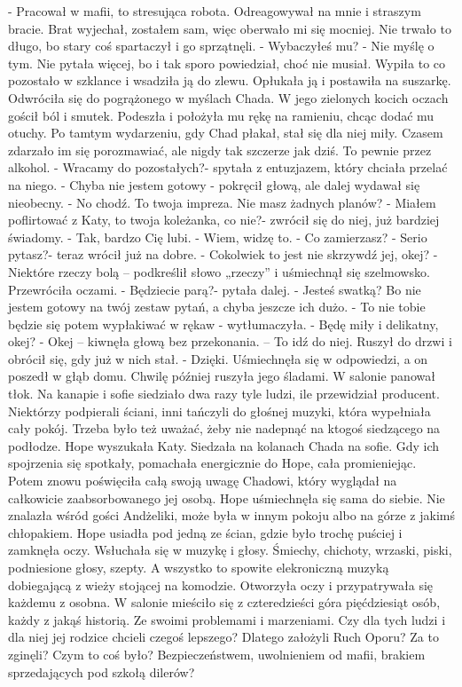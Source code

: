 \documentclass[12pt,a4paper]{book}
\begin{document}
- Pracował w mafii, to stresująca robota. Odreagowywał na mnie i straszym bracie. Brat wyjechał, zostałem sam, więc oberwało mi się mocniej. Nie trwało to długo, bo stary coś spartaczył i go sprzątnęli. 
- Wybaczyłeś mu?
- Nie myślę o tym. 
Nie pytała więcej, bo i tak sporo powiedział, choć nie musiał. Wypiła to co pozostało w szklance i wsadziła ją do zlewu. Opłukała ją i postawiła na suszarkę. 
Odwróciła się do pogrążonego w myślach Chada. W jego zielonych kocich oczach gościł ból i smutek. Podeszła i położyła mu rękę na ramieniu, chcąc dodać mu otuchy. Po tamtym wydarzeniu, gdy Chad płakał, stał się dla niej miły. Czasem zdarzało im się porozmawiać, ale nigdy tak szczerze jak dziś. To pewnie przez alkohol. 
- Wracamy do pozostałych?- spytała z entuzjazem, który chciała przelać na niego. 
- Chyba nie jestem gotowy - pokręcił głową, ale dalej wydawał się nieobecny. 
- No chodź. To twoja impreza. Nie masz żadnych planów? 
- Miałem poflirtować z Katy, to twoja koleżanka, co nie?- zwrócił się do niej, już bardziej świadomy. 
- Tak, bardzo Cię lubi.
- Wiem, widzę to. 
- Co zamierzasz?
- Serio pytasz?- teraz wrócił już na dobre.
- Cokolwiek to jest nie skrzywdź jej, okej?
- Niektóre rzeczy bolą – podkreślił słowo „rzeczy” i uśmiechnął się szelmowsko. 
Przewróciła oczami. 
- Będziecie parą?- pytała dalej.
- Jesteś swatką? Bo nie jestem gotowy na twój zestaw pytań, a chyba jeszcze ich dużo. 
- To nie tobie będzie się potem wypłakiwać w rękaw -  wytłumaczyła. 
- Będę miły i delikatny, okej?
- Okej – kiwnęła głową bez przekonania. – To idź do niej.
Ruszył do drzwi i obrócił się, gdy już w nich stał.
- Dzięki.
Uśmiechnęła się w odpowiedzi, a on poszedł w głąb domu. Chwilę później ruszyła jego śladami. W salonie panował tłok. Na kanapie i sofie siedziało dwa razy tyle ludzi, ile przewidział producent. Niektórzy podpierali ściani, inni tańczyli do głośnej muzyki, która wypełniała cały pokój. Trzeba było też uważać, żeby nie nadepnąć na ktogoś siedzącego na podłodze. Hope wyszukała Katy. Siedzała na kolanach Chada na sofie. Gdy ich spojrzenia się spotkały, pomachała energicznie do Hope, cała promieniejąc. Potem znowu poświęciła całą swoją uwagę Chadowi, który wyglądał na całkowicie zaabsorbowanego jej osobą. Hope uśmiechnęła się sama do siebie. 
Nie znalazła wśród gości Andżeliki, może była w innym pokoju albo na górze z jakimś chłopakiem. 
Hope usiadła pod jedną ze ścian, gdzie było trochę puściej i zamknęła oczy. Wsłuchała się w muzykę i głosy. Śmiechy, chichoty, wrzaski, piski, podniesione głosy, szepty. A wszystko to spowite elekroniczną muzyką dobiegającą z wieży stojącej na komodzie. Otworzyła oczy i przypatrywała się każdemu z osobna. W salonie mieściło się z czteredzieści góra pięćdziesiąt osób, każdy z jakąś historią. Ze swoimi problemami i marzeniami. Czy dla tych ludzi i dla niej jej rodzice chcieli czegoś lepszego? Dlatego założyli Ruch Oporu? Za to zginęli? Czym to coś było? Bezpieczeństwem, uwolnieniem od mafii, brakiem sprzedających pod szkołą dilerów? 
\end{document}
